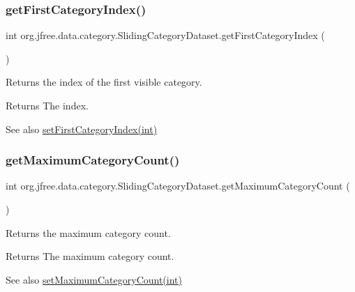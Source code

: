 \subsubsection{\texorpdfstring{get\+First\+Category\+Index()}{getFirstCategoryIndex()}}
{\footnotesize\ttfamily int org.\+jfree.\+data.\+category.\+Sliding\+Category\+Dataset.\+get\+First\+Category\+Index (\begin{DoxyParamCaption}{ }\end{DoxyParamCaption})}

Returns the index of the first visible category.

\begin{DoxyReturn}{Returns}
The index.
\end{DoxyReturn}
\begin{DoxySeeAlso}{See also}
\mbox{\hyperlink{classorg_1_1jfree_1_1data_1_1category_1_1_sliding_category_dataset_a757306381117f304d57cda56a23c9560}{set\+First\+Category\+Index(int)}} 
\end{DoxySeeAlso}
\mbox{\label{classorg_1_1jfree_1_1data_1_1category_1_1_sliding_category_dataset_aba9d4fd7a8a49f295a2704c0dc1030b3}} 
\subsubsection{\texorpdfstring{get\+Maximum\+Category\+Count()}{getMaximumCategoryCount()}}
{\footnotesize\ttfamily int org.\+jfree.\+data.\+category.\+Sliding\+Category\+Dataset.\+get\+Maximum\+Category\+Count (\begin{DoxyParamCaption}{ }\end{DoxyParamCaption})}

Returns the maximum category count.

\begin{DoxyReturn}{Returns}
The maximum category count.
\end{DoxyReturn}
\begin{DoxySeeAlso}{See also}
\mbox{\hyperlink{classorg_1_1jfree_1_1data_1_1category_1_1_sliding_category_dataset_a10e63844beab0737535bfde779f1cbff}{set\+Maximum\+Category\+Count(int)}} 
\end{DoxySeeAlso}
\mbox{\label{classorg_1_1jfree_1_1data_1_1category_1_1_sliding_category_dataset_a481c79a7d0e11052061f04089b36c18c}} 
